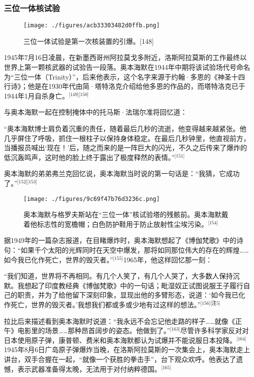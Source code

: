 \subsubsection{三位一体核试验}
\begin{figure}[ht]
\centering
\texttt{[image: ./figures/acb33303482d0ffb.png]}
\caption{三位一体试验是第一次核装置的引爆。[148]} \label{fig_ABHM_7}
\end{figure}
1945年7月16日凌晨，在新墨西哥州阿拉莫戈多附近，洛斯阿拉莫斯的工作最终以世界上第一颗核武器的试验告一段落。奥本海默在1944年中期将该试验场代号命名为“三位一体（Trinity）”，后来他表示，这个名字来源于约翰·多恩的《神圣十四行诗》；他是在1930年代由简·塔特洛克介绍给他多恩的作品的，而塔特洛克已于1944年1月自杀身亡。\(^\text{[149][150]}\)

与奥本海默一起在控制掩体中的托马斯·法瑞尔准将回忆道：

“奥本海默博士肩负着沉重的责任，随着最后几秒的流逝，他变得越来越紧张。他几乎屏住了呼吸，抓住一根柱子以保持身体稳定。在最后几秒钟里，他直视前方，当播报员喊出‘现在！’后，随之而来的是一阵巨大的闪光，不久之后传来了爆炸的低沉轰鸣声，这时他的脸上终于露出了极度释然的表情。”\(^\text{[151]}\)

奥本海默的弟弟弗兰克回忆说，奥本海默当时说的第一句话是：“我猜，它成功了。”\(^\text{[152][153]}\)
\begin{figure}[ht]
\centering
\texttt{[image: ./figures/9c69f47b76d3236c.png]}
\caption{奥本海默与格罗夫斯站在“三位一体”核试验塔的残骸前。奥本海默戴着他标志性的宽檐帽；白色防护鞋用于防止放射性尘埃污染。\(^\text{[154]}\)} \label{fig_ABHM_8}
\end{figure}
据1949年的一篇杂志报道，在目睹爆炸时，奥本海默想起了《博伽梵歌》中的诗句：“如果千个太阳的光辉同时在天空中爆发，那将如同那位伟大的存在的辉煌……如今我已化作死亡，世界的毁灭者。”\(^\text{[155]}\)1965年，他这样回忆那一刻：

“我们知道，世界将不再相同。有几个人笑了，有几个人哭了，大多数人保持沉默。我想起了印度教经典《博伽梵歌》中的一句话；毗湿奴正试图说服王子履行自己的职责，并为了给他留下深刻印象，显现出他的多臂形态，说道：‘如今我已化作死亡，世界的毁灭者。’我想我们都或多或少地有过这样的想法。”\(^\text{[156][注5]}\)

拉比后来描述看到奥本海默时说道：“我永远不会忘记他走路的样子……就像《正午》电影里的场景……那种昂首阔步的姿态。他做到了。”\(^\text{[163]}\)尽管许多科学家反对对日本使用原子弹，康普顿、费米和奥本海默都认为试爆并不能说服日本投降。\(^\text{[164]}\)1945年8月6日广岛原子弹爆炸当晚，在洛斯阿拉莫斯的一次集会上，奥本海默走上讲台，双手合握在一起，“就像一个获胜的拳击手”，台下观众欢呼。他表达了遗憾，表示武器准备得太晚，无法用于对付纳粹德国。\(^\text{[165]}\)

